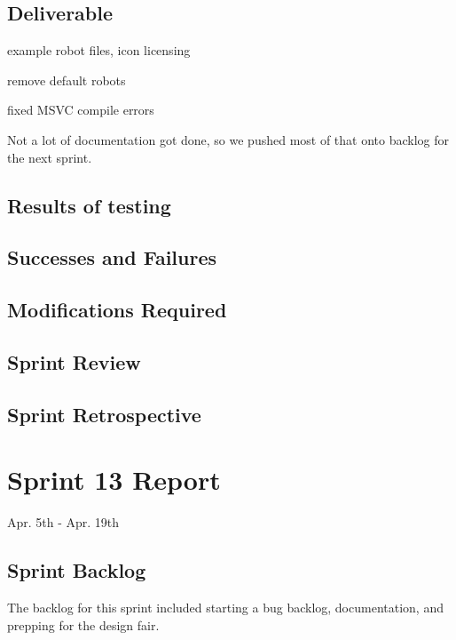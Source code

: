 \subsection{Deliverable}

example robot files, icon licensing

remove default robots

fixed MSVC compile errors

Not a lot of documentation got done, so we pushed most of that onto backlog for the next sprint.

\subsection{Results of testing}


\subsection{Successes and Failures}


\subsection{Modifications Required}


\subsection{Sprint Review}


\subsection{Sprint Retrospective}

\section{Sprint 13 Report}
Apr. 5th - Apr. 19th
\subsection{Sprint Backlog}

The backlog for this sprint included starting a bug backlog, documentation, and prepping for the design fair.

